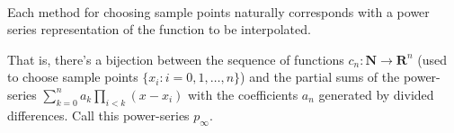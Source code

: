 \documentclass{article}
\begin{document}
    \begin{center}
    \end{center}
    { \hspace*{\fill} \\}
    
    \begin{center}
    \end{center}
    { \hspace*{\fill} \\}
    
    \begin{center}
    \end{center}
    { \hspace*{\fill} \\}
    
    \begin{center}
    \end{center}
    { \hspace*{\fill} \\}
    
    \begin{center}
    \end{center}
    { \hspace*{\fill} \\}
    
    \begin{center}
    \end{center}
    { \hspace*{\fill} \\}
    
    Each method for choosing sample points naturally corresponds with a
power series representation of the function to be interpolated.

That is, there's a bijection between the sequence of functions
\(c_n:\mathbf{N} \to \mathbf{R}^n\) (used to choose sample points
\(\{x_i : i = 0,1,\ldots, n\}\)) and the partial sums of the
power-series \(\sum_{k=0}^{n}a_k \prod_{i<k}(x-x_i)\) with the
coefficients \(a_n\) generated by divided differences. Call this
power-series \(p_\infty\).
\end{document}
